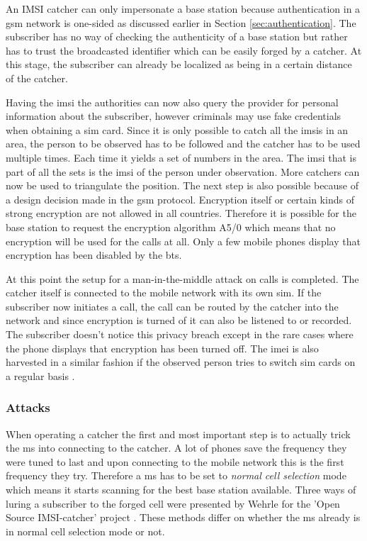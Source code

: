 An IMSI catcher can only impersonate a base station because authentication in a \gls{gsm} network is one-sided as discussed earlier in Section \ref{sec:authentication}.
The subscriber has no way of checking the authenticity of a base station but rather has to trust the broadcasted identifier which can be easily forged by a catcher.
At this stage, the subscriber can already be localized as being in a certain distance of the catcher.

Having the \gls{imsi} the authorities can now also query the provider for personal information about the subscriber, however criminals may use fake credentials when obtaining a \gls{sim} card.
Since it is only possible to catch all the \glspl{imsi} in an area, the person to be observed has to be followed and the catcher has to be used multiple times.
Each time it yields a set of numbers in the area. 
The \gls{imsi} that is part of all the sets is the \gls{imsi} of the person under observation.
More catchers can now be used to triangulate the position.
The next step is also possible because of a design decision made in the \gls{gsm} protocol.
Encryption itself or certain kinds of strong encryption are not allowed in all countries.
Therefore it is possible for the base station to request the encryption algorithm A5/0 which means that no encryption will be used for the calls at all.
Only a few mobile phones display that encryption has been disabled by the \gls{bts}.

At this point the setup for a man-in-the-middle attack \cite{mueller} on calls is completed.
The catcher itself is connected to the mobile network with its own \gls{sim}.
If the subscriber now initiates a call, the call can be routed by the catcher into the network and since encryption is turned of it can also be listened to or recorded.
The subscriber doesn't notice this privacy breach except in the rare cases where the phone displays that encryption has been turned off.
The \gls{imei} is also harvested in a similar fashion if the observed person tries to switch \gls{sim} cards on a regular basis \cite{fox}.

\subsubsection{Attacks}
\label{sec:attacks}
When operating a catcher the first and most important step is to actually trick the \gls{ms} into connecting to the catcher.
A lot of phones save the frequency they were tuned to last and upon connecting to the mobile network this is the first frequency they try.
Therefore a \gls{ms} has to be set to \emph{normal cell selection} mode which means it starts scanning for the best base station available.
Three ways of luring a subscriber to the forged cell were presented by Wehrle for the 'Open Source IMSI-catcher' project \cite{dennis}.
These methods differ on whether the \gls{ms} already is in normal cell selection mode or not.

